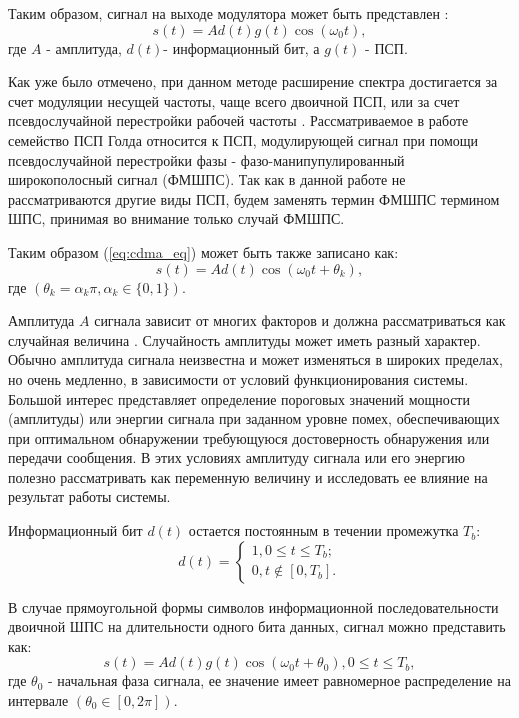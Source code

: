 Таким образом, сигнал на выходе модулятора может быть представлен \cite{shahtarin_sync}:
\begin{equation}
	\label{eq:cdma_eq}
	s(t)=Ad(t)g(t)\cos{(\omega_{0}t)},
\end{equation}
где ${A}$ - амплитуда, ${d(t)}$- информационный бит, а ${g(t)}$ - ПСП.

Как уже было отмечено, при данном методе
расширение спектра достигается за счет модуляции несущей частоты, чаще всего двоичной ПСП, или за счет псевдослучайной перестройки рабочей частоты \cite{borisovBook}.
Рассматриваемое в работе семейство ПСП Голда относится к ПСП, модулирующей сигнал при помощи псевдослучайной перестройки фазы - фазо-манипупулированный широкополосный сигнал
(ФМШПС). Так как в данной работе не рассматриваются другие виды ПСП, будем заменять термин ФМШПС термином ШПС, принимая во внимание только случай ФМШПС.

Таким образом (\ref{eq:cdma_eq}) может быть также записано как:
\begin{equation}
	\label{eq:cdma_eq_phi}
	s(t)=Ad(t)\cos{(\omega_{0}t + \theta_k)},
\end{equation}
где ${(\theta_k=\alpha_k \pi, \alpha_k \in \{0, 1\})}$.

Амплитуда ${A}$ сигнала зависит от многих факторов и должна рассматриваться как случайная величина \cite{pestryakov-book}. Случайность
амплитуды может иметь разный характер. Обычно амплитуда сигнала неизвестна и может изменяться в широких пределах,
но очень медленно, в зависимости от условий функционирования системы. Большой интерес представляет определение пороговых
значений мощности (амплитуды) или энергии сигнала при заданном уровне помех, обеспечивающих при оптимальном
обнаружении требующуюся достоверность обнаружения или передачи сообщения. В этих условиях амплитуду сигнала или его энергию
полезно рассматривать как переменную величину и исследовать ее влияние на результат работы системы.

Информационный бит ${d(t)}$ остается постоянным в течении промежутка ${T_b}$:
\begin{equation}
	\label{eq:cdma_eq_data}
	 d(t) = \begin{cases}
		1, 0 \le t \le T_b; \\
		0, t \not\in [0, T_b].
		\end{cases}
\end{equation}

В случае прямоугольной формы символов информационной последовательности двоичной ШПС на длительности одного бита данных, сигнал можно представить как:
\begin{equation}
	\label{eq:cdma_eq_phi}
	s(t)=Ad(t)g(t)\cos{(\omega_{0}t + \theta_0)}, 0 \le t \le T_b,
\end{equation}
где ${\theta_0}$ - начальная фаза сигнала, ее значение имеет равномерное распределение на интервале ${(\theta_0 \in [0, 2\pi])}$.

